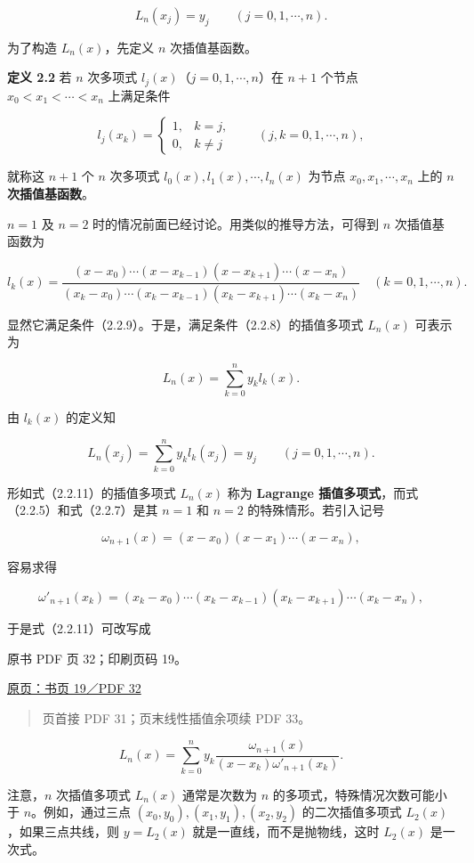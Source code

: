 \[
L_n(x_j)=y_j\qquad(j=0,1,\cdots,n).
\tag{2.2.8}
\]

为了构造 \(L_n(x)\)，先定义 \(n\) 次插值基函数。

\textbf{定义 2.2} 若 \(n\) 次多项式 \(l_j(x)\)（\(j=0,1,\cdots,n\)）在 \(n+1\) 个节点 \(x_0<x_1<\cdots<x_n\) 上满足条件

\[
l_j(x_k)=
\begin{cases}
1,&k=j,\\
0,&k\ne j
\end{cases}
\qquad(j,k=0,1,\cdots,n),
\tag{2.2.9}
\]

就称这 \(n+1\) 个 \(n\) 次多项式 \(l_0(x),l_1(x),\cdots,l_n(x)\) 为节点 \(x_0,x_1,\cdots,x_n\) 上的 \textbf{\(n\) 次插值基函数}。

\(n=1\) 及 \(n=2\) 时的情况前面已经讨论。用类似的推导方法，可得到 \(n\) 次插值基函数为

\[
l_k(x)=
\frac{(x-x_0)\cdots(x-x_{k-1})(x-x_{k+1})\cdots(x-x_n)}
{(x_k-x_0)\cdots(x_k-x_{k-1})(x_k-x_{k+1})\cdots(x_k-x_n)}
\quad(k=0,1,\cdots,n).
\tag{2.2.10}
\]

显然它满足条件（2.2.9）。于是，满足条件（2.2.8）的插值多项式 \(L_n(x)\) 可表示为

\[
L_n(x)=\sum_{k=0}^{n}y_kl_k(x).
\tag{2.2.11}
\]

由 \(l_k(x)\) 的定义知

\[
L_n(x_j)=\sum_{k=0}^{n}y_kl_k(x_j)=y_j
\qquad(j=0,1,\cdots,n).
\]

形如式（2.2.11）的插值多项式 \(L_n(x)\) 称为 \textbf{Lagrange 插值多项式}，而式（2.2.5）和式（2.2.7）是其 \(n=1\) 和 \(n=2\) 的特殊情形。若引入记号

\[
\omega_{n+1}(x)=(x-x_0)(x-x_1)\cdots(x-x_n),
\tag{2.2.12}
\]

容易求得

\[
\omega'_{n+1}(x_k)
=(x_k-x_0)\cdots(x_k-x_{k-1})(x_k-x_{k+1})\cdots(x_k-x_n),
\]

于是式（2.2.11）可改写成

\clearpage

原书 PDF 页 32；印刷页码 19。

\href{source-images/pdf-032.jpeg}{原页：书页 19／PDF 32}

\begin{quote}
页首接 PDF 31；页末线性插值余项续 PDF 33。
\end{quote}

\[
L_n(x)=\sum_{k=0}^{n}y_k
\frac{\omega_{n+1}(x)}
{(x-x_k)\omega'_{n+1}(x_k)}.
\tag{2.2.13}
\]

注意，\(n\) 次插值多项式 \(L_n(x)\) 通常是次数为 \(n\) 的多项式，特殊情况次数可能小于 \(n\)。例如，通过三点 \((x_0,y_0),(x_1,y_1),(x_2,y_2)\) 的二次插值多项式 \(L_2(x)\)，如果三点共线，则 \(y=L_2(x)\) 就是一直线，而不是抛物线，这时 \(L_2(x)\) 是一次式。

